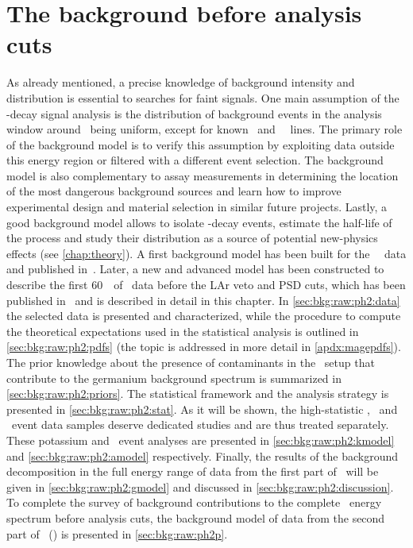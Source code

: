 
\chapter{The background before analysis cuts}\label{chap:bkg:raw:ph2}

As already mentioned, a precise knowledge of background intensity and distribution is
essential to searches for faint signals. One main assumption of the \onbb-decay signal
analysis is the distribution of background events in the analysis window around \qbb\
being uniform, except for known \Tl\ and \Bil\ \g\ lines. The primary role of the
background model is to verify this assumption by exploiting data outside this energy
region or filtered with a different event selection. The background model is also
complementary to assay measurements in determining the location of the most dangerous
background sources and learn how to improve experimental design and material selection in
similar future projects. Lastly, a good background model allows to isolate \nnbb-decay
events, estimate the half-life of the process and study their distribution as a source of
potential new-physics effects (see \cref{chap:theory}).
\newpar
A first background model has been built for the \gerda\ \phaseone\ data and published
in~\cite{Agostini2013a}. Later, a new and advanced model has been constructed to describe
the first 60~\kgyr\ of \phasetwo\ data before the LAr veto and PSD cuts, which has been
published in~\cite{Agostini2019b} and is described in detail in this chapter. In
\cref{sec:bkg:raw:ph2:data} the selected data is presented and characterized, while the
procedure to compute the theoretical expectations used in the statistical analysis is
outlined in \cref{sec:bkg:raw:ph2:pdfs} (the topic is addressed in more detail in
\cref{apdx:magepdfs}). The prior knowledge about the presence of contaminants in the
\gerda\ setup that contribute to the germanium background spectrum is summarized in
\cref{sec:bkg:raw:ph2:priors}. The statistical framework and the analysis strategy is
presented in \cref{sec:bkg:raw:ph2:stat}. As it will be shown, the high-statistic \kvn,
\kvz\ and \a\ event data samples deserve dedicated studies and are thus treated
separately. These potassium and \a\ event analyses are presented in
\cref{sec:bkg:raw:ph2:kmodel} and \cref{sec:bkg:raw:ph2:amodel} respectively. Finally, the
results of the background decomposition in the full energy range of data from the first
part of \phasetwo\ will be given in \cref{sec:bkg:raw:ph2:gmodel} and discussed in
\cref{sec:bkg:raw:ph2:discussion}. To complete the survey of background contributions to
the complete \gerdatwo\ energy spectrum before analysis cuts, the background model of data
from the second part of \phasetwo\ (\phasetwop) is presented in \cref{sec:bkg:raw:ph2p}.

